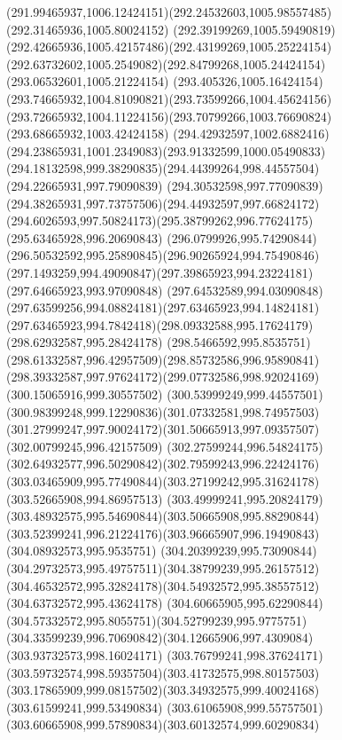 {    \curveto(291.99465937,1006.12424151)(292.24532603,1005.98557485)(292.31465936,1005.80024152)
    \curveto(292.39199269,1005.59490819)(292.42665936,1005.42157486)(292.43199269,1005.25224154)
    \curveto(292.63732602,1005.2549082)(292.84799268,1005.24424154)(293.06532601,1005.21224154)
    \curveto(293.405326,1005.16424154)(293.74665932,1004.81090821)(293.73599266,1004.45624156)
    \curveto(293.72665932,1004.11224156)(293.70799266,1003.76690824)(293.68665932,1003.42424158)
    \curveto(294.42932597,1002.6882416)(294.23865931,1001.2349083)(293.91332599,1000.05490833)
    \curveto(294.18132598,999.38290835)(294.44399264,998.44557504)(294.22665931,997.79090839)
    \curveto(294.30532598,997.77090839)(294.38265931,997.73757506)(294.44932597,997.66824172)
    \curveto(294.6026593,997.50824173)(295.38799262,996.77624175)(295.63465928,996.20690843)
    \curveto(296.0799926,995.74290844)(296.50532592,995.25890845)(296.90265924,994.75490846)
    \curveto(297.1493259,994.49090847)(297.39865923,994.23224181)(297.64665923,993.97090848)
    \curveto(297.64532589,994.03090848)(297.63599256,994.08824181)(297.63465923,994.14824181)
    \curveto(297.63465923,994.7842418)(298.09332588,995.17624179)(298.62932587,995.28424178)
    \curveto(298.5466592,995.8535751)(298.61332587,996.42957509)(298.85732586,996.95890841)
    \curveto(298.39332587,997.97624172)(299.07732586,998.92024169)(300.15065916,999.30557502)
    \curveto(300.53999249,999.44557501)(300.98399248,999.12290836)(301.07332581,998.74957503)
    \curveto(301.27999247,997.90024172)(301.50665913,997.09357507)(302.00799245,996.42157509)
    \curveto(302.27599244,996.54824175)(302.64932577,996.50290842)(302.79599243,996.22424176)
    \curveto(303.03465909,995.77490844)(303.27199242,995.31624178)(303.52665908,994.86957513)
    \curveto(303.49999241,995.20824179)(303.48932575,995.54690844)(303.50665908,995.88290844)
    \curveto(303.52399241,996.21224176)(303.96665907,996.19490843)(304.08932573,995.9535751)
    \curveto(304.20399239,995.73090844)(304.29732573,995.49757511)(304.38799239,995.26157512)
    \curveto(304.46532572,995.32824178)(304.54932572,995.38557512)(304.63732572,995.43624178)
    \curveto(304.60665905,995.62290844)(304.57332572,995.8055751)(304.52799239,995.9775751)
    \curveto(304.33599239,996.70690842)(304.12665906,997.4309084)(303.93732573,998.16024171)
    \curveto(303.76799241,998.37624171)(303.59732574,998.59357504)(303.41732575,998.80157503)
    \curveto(303.17865909,999.08157502)(303.34932575,999.40024168)(303.61599241,999.53490834)
    \curveto(303.61065908,999.55757501)(303.60665908,999.57890834)(303.60132574,999.60290834)
}
